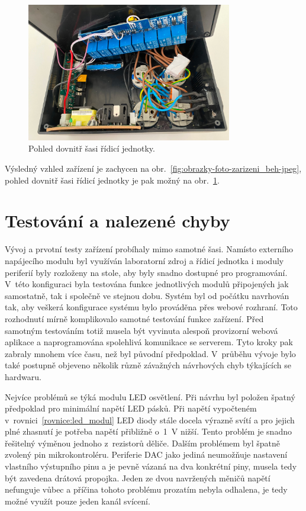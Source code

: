 \begin{figure}[h!]
    \centering
    \includegraphics[width=0.8\textwidth]{obrazky/foto/ulozeni.jpeg}
    \caption{Pohled dovnitř šasi řídicí jednotky.}
    \label{fig:obrazky-foto-ulozeni-jpeg}
\end{figure}


Výsledný vzhled zařízení je zachycen na obr.~\ref{fig:obrazky-foto-zarizeni_beh-jpeg}, pohled dovnitř šasi řídicí jednotky je pak možný na obr.~\ref{fig:obrazky-foto-ulozeni-jpeg}.

\section{Testování a nalezené chyby}
    Vývoj a prvotní testy zařízení probíhaly mimo samotné šasi. Namísto externího napájecího modulu byl využíván laboratorní zdroj a řídicí jednotka i moduly periferií byly rozloženy na stole, aby byly snadno dostupné pro programování. V~této konfiguraci byla testována funkce jednotlivých modulů připojených jak samostatně, tak i společně ve stejnou dobu. Systém byl od počátku navrhován tak, aby veškerá konfigurace systému bylo prováděna přes webové rozhraní. Toto rozhodnutí mírně komplikovalo samotné testování funkce zařízení. Před samotným testováním totiž musela být vyvinuta alespoň provizorní webová aplikace a naprogramována spolehlivá komunikace se serverem. Tyto kroky pak zabraly mnohem více času, než byl původní předpoklad. V~průběhu vývoje bylo také postupně objeveno několik různě závažných návrhových chyb týkajících se hardwaru. 
    
    Nejvíce problémů se týká modulu LED osvětlení. Při návrhu byl položen špatný předpoklad pro minimální napětí LED pásků. Při napětí vypočteném v~rovnici~\ref{rovnice:led_modul} LED diody stále docela výrazně svítí a pro jejich plné zhasnutí je potřeba napětí přibližně o~\qty{1}{V} nižší. Tento problém je snadno řešitelný výměnou jednoho z~rezistorů děliče. Dalším problémem byl špatně zvolený pin mikrokontroléru. Periferie DAC jako jediná neumožňuje nastavení vlastního výstupního pinu a je pevně vázaná na dva konkrétní piny, musela tedy být zavedena drátová propojka. Jeden ze dvou navržených měničů napětí nefunguje vůbec a příčina tohoto problému prozatím nebyla odhalena, je tedy možné využít pouze jeden kanál svícení. 

